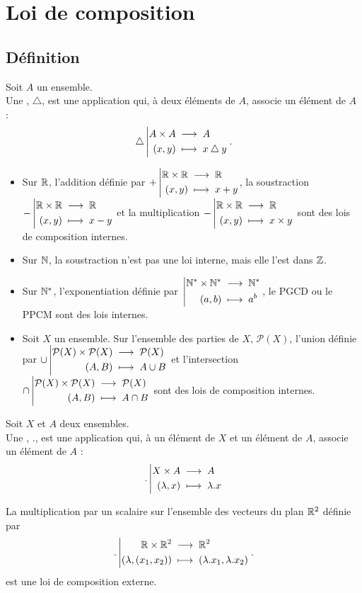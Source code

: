 \documentclass{book}
\begin{document}
\section{Loi de composition}
\subsection{Définition}
\begin{Definition}
Soit $A$ un ensemble.\\
Une , $\bigtriangleup$, est une application qui, à deux éléments de $A$, associe un élément de $A$ :
$$ {\bigtriangleup}\left|\begin{aligned}{A\times A}&\;\longrightarrow\;{A}\\{(x,y)}&\;\longmapsto\;{x \bigtriangleup y}\end{aligned}\right..$$
\end{Definition}
\begin{Exemple}
\begin{itemize}
\item Sur $\mathbb{R}$, l'addition définie par ${+}\left|\begin{aligned}{\mathbb{R}\times \mathbb{R}}&\;\longrightarrow\;{\mathbb{R}}\\{(x,y)}&\;\longmapsto\;{x + y}\end{aligned}\right.$, la soustraction ${-}\left|\begin{aligned}{\mathbb{R}\times \mathbb{R}}&\;\longrightarrow\;{\mathbb{R}}\\{(x,y)}&\;\longmapsto\;{x - y}\end{aligned}\right.$ et la multiplication ${-}\left|\begin{aligned}{\mathbb{R}\times \mathbb{R}}&\;\longrightarrow\;{\mathbb{R}}\\{(x,y)}&\;\longmapsto\;{x \times y}\end{aligned}\right.$ sont des lois de composition internes.
\item Sur $\mathbb{N}$, la soustraction n'est pas une loi interne, mais elle l'est dans $\mathbb{Z}$.
\item Sur $\mathbb{N}^*$,  l'exponentiation définie par ${}\left|\begin{aligned}{\mathbb{N}^*\times\mathbb{N}^*}&\;\longrightarrow\;{\mathbb{N}^*}\\{(a,b)}&\;\longmapsto\;{a^b}\end{aligned}\right.$, le PGCD ou le PPCM sont des lois internes.
\item Soit $X$ un ensemble. Sur l'ensemble des parties de $X$, $\mathcal{P}(X)$, l'union définie par ${\cup}\left|\begin{aligned}{\mathcal{P}(X)\times \mathcal{P}(X)}&\;\longrightarrow\;{\mathcal{P}(X)}\\{(A,B)}&\;\longmapsto\;{A \cup B}\end{aligned}\right.$ et l'intersection ${\cap}\left|\begin{aligned}{\mathcal{P}(X)\times \mathcal{P}(X)}&\;\longrightarrow\;{\mathcal{P}(X)}\\{(A,B)}&\;\longmapsto\;{A \cap B}\end{aligned}\right.$ sont des lois de composition internes.
\end{itemize}
\end{Exemple}

\begin{Definition} 
Soit $X$ et $A$ deux ensembles.\\
Une , $.$, est une application qui, à un élément de $X$ et un élément de $A$, associe un élément de $A$ :
$$ {.}\left|\begin{aligned}{X\times A}&\;\longrightarrow\;{A}\\{(\lambda,x)}&\;\longmapsto\;{\lambda. x}\end{aligned}\right. $$
\end{Definition}
\begin{Exemple}[\((\R^2,.)\)]
La multiplication par un scalaire sur l'ensemble des vecteurs du plan  $\mathbb{R}^2$ définie par 
$$ {.}\left|\begin{aligned}{\mathbb{R}\times\mathbb{R}^2}&\;\longrightarrow\;{\mathbb{R}^2}\\{(\lambda,(x_1,x_2))}&\;\longmapsto\;{(\lambda.x_1, \lambda.x_2)}\end{aligned}\right..$$ est une loi de composition externe.
\end{Exemple}
\end{document}
